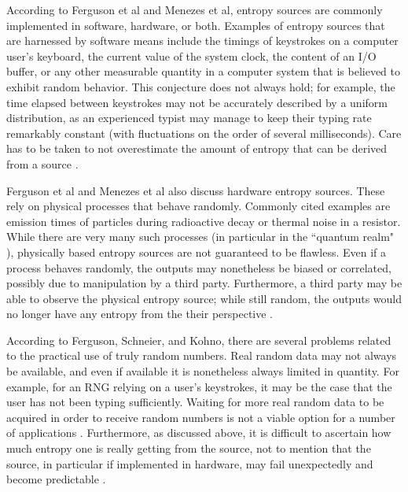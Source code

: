 \documentclass[12pt, titlepage]{report}
\theoremstyle{definition}
\begin{document}
According to Ferguson et al and Menezes et al, entropy sources are commonly implemented in software, hardware, or both. Examples of entropy sources that are harnessed by software means include the timings of keystrokes on a computer user's keyboard, the current value of the system clock, the content of an I/O buffer, or any other measurable quantity in a computer system that is believed to exhibit random behavior. This conjecture does not always hold; for example, the time elapsed between keystrokes may not be accurately described by a uniform distribution, as an experienced typist may manage to keep their typing rate remarkably constant (with fluctuations on the order of several milliseconds). Care has to be taken to not overestimate the amount of entropy that can be derived from a source \cite[p. 138-139]{ferguson2010cryptography} \cite[p. 171-172]{menezes1996handbook}.

Ferguson et al and Menezes et al also discuss hardware entropy sources. These rely on physical processes that behave randomly. Commonly cited examples are emission times of particles during radioactive decay or thermal noise in a resistor. While there are very many such processes (in particular in the ``quantum realm" \cite{bierhorst2018experimentally}), physically based entropy sources are not guaranteed to be flawless. Even if a process behaves randomly, the outputs may nonetheless be biased or correlated, possibly due to manipulation by a third party. Furthermore, a third party may be able to observe the physical entropy source; while still random, the outputs would no longer have any entropy from the their perspective \cite[p. 138-139]{ferguson2010cryptography} \cite[p. 172]{menezes1996handbook}.

According to Ferguson, Schneier, and Kohno, there are several problems related to the practical use of truly random numbers. Real random data may not always be available, and even if available it is nonetheless always limited in quantity. For example, for an RNG relying on a user's keystrokes, it may be the case that the user has not been typing sufficiently. Waiting for more real random data to be acquired in order to receive random numbers is not a viable option for a number of applications \cite[p. 139]{ferguson2010cryptography}. Furthermore, as discussed above, it is difficult to ascertain how much entropy one is really getting from the source, not to mention that the source, in particular if implemented in hardware, may fail unexpectedly and become predictable \cite{ferguson2010cryptography}.
\end{document}
